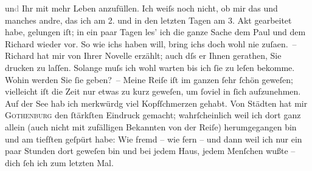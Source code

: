 \begin{ledgroupsized}[t]{13cm}
                        un\textcolor{gray}{d} Ihr mit mehr Leben anzufüllen. Ich weiſs noch nicht,
                    ob mir das {\pb}und manches andre, das ich am 2. und in den letzten Tagen
                    am 3. Akt gearbeitet habe,
                    gelungen iſt; in ein paar Tagen les’ ich die ganze Sache dem Paul und dem Richard
                    wieder vor. So wie ichs haben will, bring ichs doch wohl nie zuſa{\geminationm}en. –\pend
           \pstart
           Richard hat mir von Ihrer Novelle erzählt; auch dſs er Ihnen
                    gerathen, Sie drucken zu laſſen. Solange muſs ich wohl warten bis
                    ich ſie zu leſen bekomme. Wohin werden Sie ſie geben? –\pend
           \pstart
           Meine Reiſe iſt im ganzen ſehr ſchön geweſen; vielleicht iſt die Zeit nur {\pb}etwas zu kurz geweſen, um ſoviel in ſich
                    aufzunehmen.\pend
           \pstart
           Auf der See hab ich merkwürdg viel Kopfſchmerzen gehabt. Von Städten hat mir \textsc{Gothenburg} den
                    ſtärkſten Eindruck gemacht; wahrſcheinlich weil ich dort ganz allein (auch nicht
                    mit zufälligen Bekannten von der Reiſe) herumgegangen bin und am tiefſten
                    geſpürt habe: Wie fremd – wie fern – und dann weil ich nur ein paar Stunden dort
                    geweſen bin und bei jedem Haus, jedem Menſchen {\pb}wußte – dich ſeh ich zum letzten Mal.\pend

\end{ledgroupsized}
